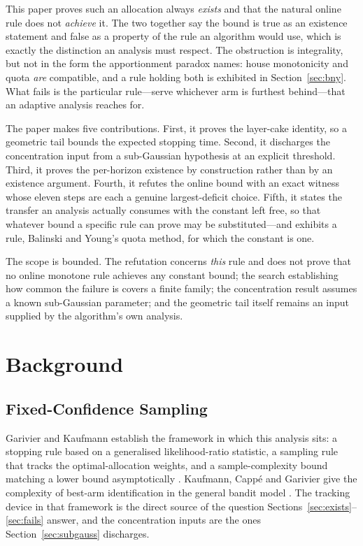 \documentclass[conference]{IEEEtran}
\theoremstyle{definition}
\begin{document}
This paper proves such an allocation always \emph{exists} and that the natural online rule does
not \emph{achieve} it. The two together say the bound is true as an existence statement and
false as a property of the rule an algorithm would use, which is exactly the distinction an
analysis must respect. The obstruction is integrality, but not in the form the apportionment paradox names: house
monotonicity and quota \emph{are} compatible, and a rule holding both is exhibited in
Section~\ref{sec:bny}. What fails is the particular rule---serve whichever arm is furthest
behind---that an adaptive analysis reaches for.

The paper makes five contributions. First, it proves the layer-cake identity, so a geometric
tail bounds the expected stopping time. Second, it discharges the concentration input from a
sub-Gaussian hypothesis at an explicit threshold. Third, it proves the per-horizon existence
by construction rather than by an existence argument. Fourth, it refutes the online bound with
an exact witness whose eleven steps are each a genuine largest-deficit choice. Fifth, it
states the transfer an analysis actually consumes with the constant left free, so that
whatever bound a specific rule can prove may be substituted---and exhibits a rule, Balinski
and Young's quota method, for which the constant is one.

The scope is bounded. The refutation concerns \emph{this} rule and does not prove that no
online monotone rule achieves any constant bound; the search establishing how common the
failure is covers a finite family; the concentration result assumes a known sub-Gaussian
parameter; and the geometric tail itself remains an input supplied by the algorithm's own
analysis.

\section{Background}

\subsection{Fixed-Confidence Sampling}

Garivier and Kaufmann establish the framework in which this analysis sits: a stopping rule
based on a generalised likelihood-ratio statistic, a sampling rule that tracks the
optimal-allocation weights, and a sample-complexity bound matching a lower bound
asymptotically \cite{garivier2016}. Kaufmann, Capp\'e and Garivier give the complexity of
best-arm identification in the general bandit model \cite{kaufmann2016}. The tracking device
in that framework is the direct source of the question
Sections~\ref{sec:exists}--\ref{sec:fails} answer, and the concentration inputs are the ones
Section~\ref{sec:subgauss} discharges.
\end{document}
